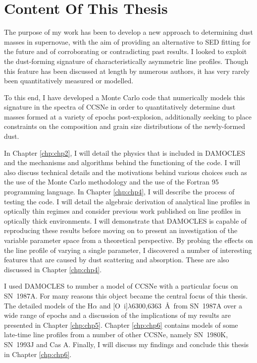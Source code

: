\section{Content Of This Thesis}
The purpose of my work has been to develop a new approach to determining dust masses in supernovae, with the aim of providing an alternative to SED fitting for the future and of corroborating or contradicting past results.  I looked to exploit the dust-forming signature of characteristically asymmetric line profiles.  Though this feature has been discussed at length by numerous authors, it has very rarely been quantitatively measured or modelled.

To this end, I have developed a Monte Carlo  code that numerically models this signature in the spectra of CCSNe in order to quantitatively determine dust masses formed at a variety of epochs post-explosion, additionally seeking to place constraints on the composition and grain size distributions of the newly-formed dust.

In Chapter \ref{chp:chp2}, I will detail the physics that is included in DAMOCLES and the mechanisms and algorithms behind the functioning of the code.  I will also discuss technical details and the motivations behind various choices such as the use of the Monte Carlo methodology and the use of the Fortran 95 programming language.  In Chapter \ref{chp:chp4}, I will describe the process of testing the code.  I will detail the algebraic derivation of analytical line profiles in optically thin regimes and consider previous work published on line profiles in optically thick environments.  I will demonstrate that DAMOCLES is capable of reproducing these results before moving on to present an investigation of the variable parameter space from a theoretical perspective.  By probing the effects on the line profile of varying a single parameter, I discovered a number of interesting features that are caused by dust scattering and absorption.  These are also discussed in Chapter \ref{chp:chp4}.  

I used DAMOCLES to number a model of CCSNe with a particular focus on SN~1987A.  For many reasons this object became the central focus of this thesis. The detailed models of the H$\alpha$ and [O~{\sc i}]$\lambda$6300,6363~\AA\ from SN~1987A over a wide range of epochs and a discussion of the implications of my results are presented in Chapter \ref{chp:chp5}.  Chapter \ref{chp:chp6} contains models of some late-time line profiles from a number of other CCSNe, namely SN~1980K, SN~1993J and Cas A.  Finally, I will discuss my findings and conclude this thesis in Chapter \ref{chp:chp6}.

